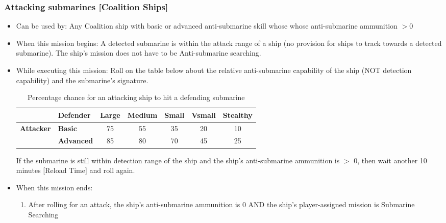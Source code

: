 \documentclass{article}
\begin{document}
    \subsubsection{Attacking submarines [Coalition Ships]}
            \begin{itemize}
                \item{Can be used by:} Any Coalition ship with basic or advanced anti-submarine skill whose whose anti-submarine ammunition $>0$
                \item{When this mission begins:} A detected submarine is within the attack range of a ship (no provision for ships to track towards a detected submarine). The ship's mission does not have to be Anti-submarine searching.
                \item{While executing this mission:} Roll on the table below about the relative anti-submarine capability of the ship (NOT detection capability) and the submarine's signature.
                    \begin{table}[h!]
                        \centering
                        \begin{tabular}{|l|l|c|c|c|c|c|}
                        \hline
                        \textbf{} & \textbf{Defender} & \textbf{Large} & \textbf{Medium} & \textbf{Small} & \textbf{Vsmall} & \textbf{Stealthy} \\ \hline
                        \multirow{2}{*}{\textbf{Attacker}} & \textbf{{Basic}}  & 75 & 55 & 35 & 20 & 10 \\ \cline{2-7} 
                         & \textbf{Advanced} & 85 & 80 & 70 & 45 & 25 \\ \hline
                        \end{tabular}
                        \caption{Percentage chance for an attacking ship to hit a defending submarine}
                        \label{tab:CoalitionShipsvsChineseSubmarines}
                    \end{table}
                    If the submarine is still within detection range of the ship and the ship's anti-submarine ammunition is $>$ 0, then wait another 10 minutes [Reload Time] and roll again.
                \item{When this mission ends:}
                \begin{enumerate}[label=\arabic*)]
                    \item After rolling for an attack, the ship's anti-submarine ammunition is 0 AND the ship's player-assigned mission is Submarine Searching \par

\end{enumerate}
\end{itemize}
\end{document}
